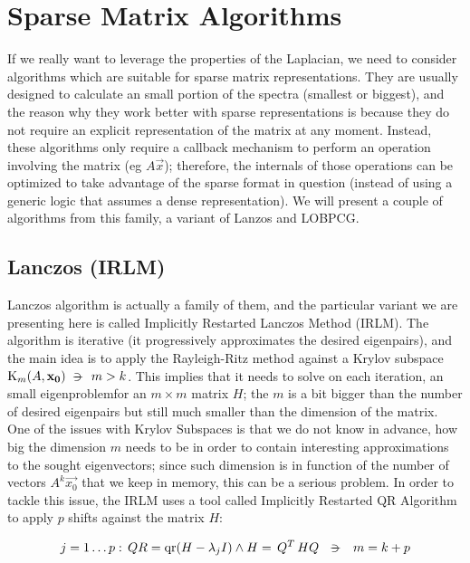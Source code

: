 \section{Sparse Matrix Algorithms}

If we really want to leverage the properties of the Laplacian, we need
to consider algorithms which are suitable for sparse matrix
representations. They are usually designed to calculate an small
portion of the spectra (smallest or biggest), and the reason why they
work better with sparse representations is because they do not require
an explicit representation of the matrix at any moment. Instead, these
algorithms only require a callback mechanism to perform an operation
involving the matrix (eg $A\vec{x}$); therefore, the internals of
those operations can be optimized to take advantage of the sparse
format in question (instead of using a generic logic that assumes a
dense representation). We will present a couple of algorithms from
this family, a variant of Lanzos and LOBPCG.

\subsection{Lanczos (IRLM)}

Lanczos algorithm is actually a family of them, and the particular
variant we are presenting here is called Implicitly Restarted Lanczos
Method (IRLM). The algorithm is iterative (it progressively approximates the
desired eigenpairs), and the main idea is to apply the Rayleigh-Ritz
method against a Krylov subspace $\Krylov{A}{\vec{x_0}}{m} \suchthat m
> k$. This implies that it needs to solve on each iteration, an small
eigenproblemfor an $m \times m$ matrix $H$; the $m$ is a bit bigger
than the number of desired eigenpairs but still much smaller than the
dimension of the matrix. \\

One of the issues with Krylov Subspaces is that we do not know in
advance, how big the dimension $m$ needs to be in order to contain
interesting approximations to the sought eigenvectors; since such
dimension is in function of the number of vectors $A^k \vec{x_0}$ that
we keep in memory, this can be a serious problem. In order to tackle
this issue, the IRLM uses a tool called Implicitly Restarted QR
Algorithm to apply $p$ shifts against the matrix $H$:

\begin{equation*}
    j=1 \ldots p:\, QR = \func{qr}(H - \lambda_j I) \land H = \trans{Q}HQ
    \ds{\suchthat}
    m = k + p
\end{equation*}
\joinbelow{1cm}

